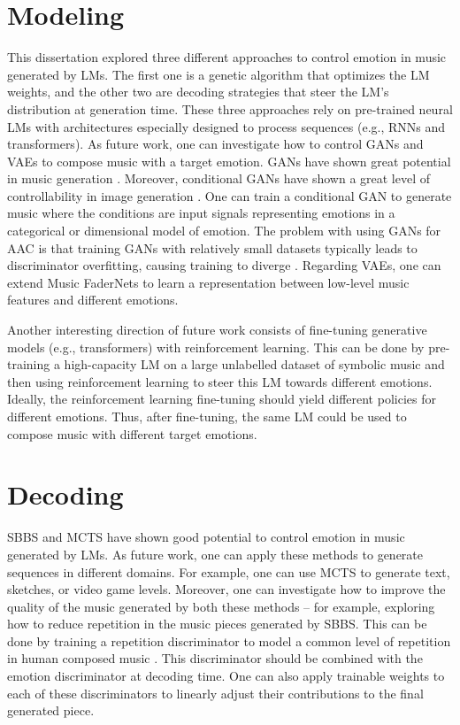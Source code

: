 \section{Modeling}

This dissertation explored three different approaches to control emotion in music generated by LMs. The first one is a genetic algorithm that optimizes the LM weights, and the other two are decoding strategies that steer the LM's distribution at generation time. These three approaches rely on pre-trained neural LMs with architectures especially designed to process sequences (e.g., RNNs and transformers). As future work, one can investigate how to control GANs and VAEs to compose music with a target emotion. GANs have shown great potential in music generation \cite{muhamed2021symbolic}. Moreover, conditional GANs have shown a great level of controllability in image generation \cite{mirza2014conditional}. One can train a conditional GAN to generate music where the conditions are input signals representing emotions in a categorical or dimensional model of emotion. The problem with using GANs for AAC is that training GANs with relatively small datasets typically leads to discriminator overfitting, causing training to diverge \cite{karras2020training}. Regarding VAEs, one can extend Music FaderNets \cite{tan2020music} to learn a representation between low-level music features and different emotions.

Another interesting direction of future work consists of fine-tuning generative models (e.g., transformers) with reinforcement learning. This can be done by pre-training a high-capacity LM on a large unlabelled dataset of symbolic music and then using reinforcement learning to steer this LM towards different emotions. Ideally, the reinforcement learning fine-tuning should yield different policies for different emotions. Thus, after fine-tuning, the same LM could be used to compose music with different target emotions.

\section{Decoding}

SBBS and MCTS have shown good potential to control emotion in music generated by LMs. As future work, one can apply these methods to generate sequences in different domains. For example, one can use MCTS to generate text, sketches, or video game levels. Moreover, one can investigate how to improve the quality of the music generated by both these methods -- for example, exploring how to reduce repetition in the music pieces generated by SBBS. This can be done by training a repetition discriminator to model a common level of repetition in human composed music \cite{holtzman2018learning}. This discriminator should be combined with the emotion discriminator at decoding time. One can also apply trainable weights to each of these discriminators to linearly adjust their contributions to the final generated piece.

